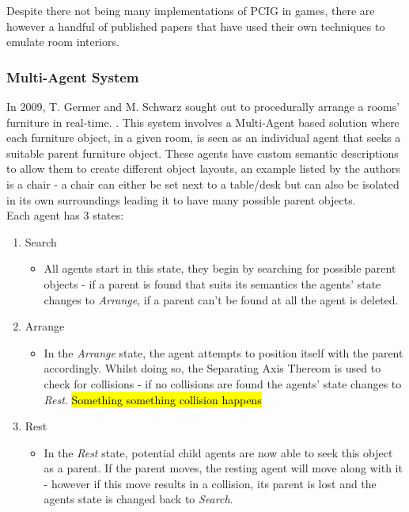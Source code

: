 Despite there not being many implementations of PCIG in games, there are however a handful of published papers that have used their own techniques to emulate room interiors.
\subsubsection*{Multi-Agent System}
In 2009, T. Germer and M. Schwarz sought out to procedurally arrange a rooms' furniture in real-time. \cite{real-time-walkthroughs}\cite{youtube:real-time-walkthroughs}. This system involves a Multi-Agent based solution where each furniture object, in a given room, is seen as an individual agent that seeks a suitable parent furniture object. These agents have custom semantic descriptions to allow them to create different object layouts, an example listed by the authors is a chair - a chair can either be set next to a table/desk but can also be isolated in its own surroundings leading it to have many possible parent objects.\\
Each agent has 3 states:
\begin{enumerate}
    \item Search
        \begin{itemize}
            \item All agents start in this state, they begin by searching for possible parent objects - if a parent is found that suits its semantics the agents' state changes to \textit{Arrange}, if a parent can't be found at all the agent is deleted.
        \end{itemize}
    \item Arrange
        \begin{itemize}
            \item In the \textit{Arrange} state, the agent attempts to position itself with the parent accordingly. Whilst doing so, the Separating Axis Thereom \cite{separating-axis-thereom} is used to check for collisions - if no collisions are found the agents' state changes to \textit{Rest}. \hl{Something something collision happens}
        \end{itemize}
    \item Rest
        \begin{itemize}
            \item In the \textit{Rest} state, potential child agents are now able to seek this object as a parent. If the parent moves, the resting agent will move along with it - however if this move results in a collision, its parent is lost and the agents state is changed back to \textit{Search}.
        \end{itemize}
\end{enumerate}

